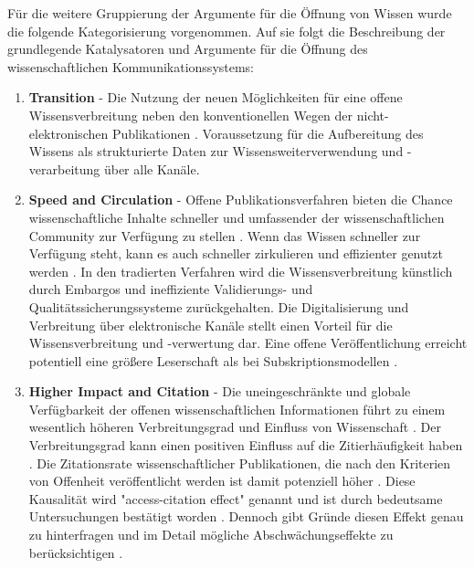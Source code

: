 Für die weitere Gruppierung der Argumente für die Öffnung von Wissen wurde die folgende Kategorisierung vorgenommen. Auf sie folgt die Beschreibung der grundlegende Katalysatoren und Argumente für die Öffnung des wissenschaftlichen Kommunikationssystems:
\begin{enumerate}
\item \textbf{Transition} - Die Nutzung der neuen Möglichkeiten für eine offene Wissensverbreitung neben den konventionellen Wegen der nicht-elektronischen Publikationen \cite{hall_2008_digitize} \cite{berliner_erklaerung_2003}. Voraussetzung für die Aufbereitung des Wissens als strukturierte Daten zur Wissensweiterverwendung und -verarbeitung über alle Kanäle.
\item \textbf{Speed and Circulation} - Offene Publikationsverfahren bieten die Chance wissenschaftliche Inhalte schneller und umfassender der wissenschaftlichen Community zur Verfügung zu stellen \cite{muller_2010_open}\cite{RIN_2010_open_research} \cite{hall_2008_digitize} \cite{EuropeanCommission_sciencepub_2006}. Wenn das Wissen schneller zur Verfügung steht, kann es auch schneller zirkulieren und effizienter genutzt werden \cite{Woelfle_2011}. In den tradierten Verfahren wird die Wissensverbreitung künstlich durch Embargos und ineffiziente Validierungs- und Qualitätssicherungssysteme zurückgehalten. Die Digitalisierung und Verbreitung über elektronische Kanäle stellt einen Vorteil für die Wissensverbreitung und -verwertung dar. Eine offene Veröffentlichung erreicht potentiell eine größere Leserschaft als bei Subskriptionsmodellen \cite{cope2014future}.
\item \textbf{Higher Impact and Citation} - Die uneingeschränkte und globale Verfügbarkeit der offenen wissenschaftlichen Informationen führt zu einem wesentlich höheren Verbreitungsgrad und Einfluss von Wissenschaft \cite{davis_2011_open} \cite{muller_2010_open} \cite{Baggs_2006} \cite{cite:5} \cite{Kurtz2005_oa_citation}. Der Verbreitungsgrad kann einen positiven Einfluss auf die Zitierhäufigkeit haben \cite{muller_2010_open} \cite{EuropeanCommission_sciencepub_2006} \cite{Hajjem_2005}. Die Zitationsrate wissenschaftlicher Publikationen, die nach den Kriterien von Offenheit veröffentlicht werden ist damit potenziell höher \cite{cite:21a}. Diese Kausalität wird "access-citation effect"\cite{davis_2011_open} genannt und ist durch bedeutsame Untersuchungen bestätigt worden \cite{Lawrence_2001} \cite{Jeffrey_2008} \cite{Hajjem_2005} \cite{Eysenbach_2006} \cite{Antelman_2004}. Dennoch gibt Gründe diesen Effekt genau zu hinterfragen und im Detail mögliche Abschwächungseffekte zu berücksichtigen \cite{davis_2011_open} \cite{davis_2008_open}.

\end{enumerate}
